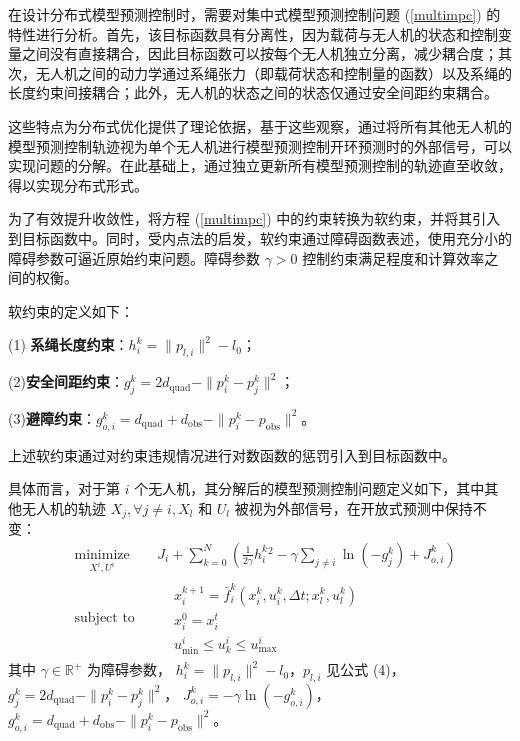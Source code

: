 \documentclass[lang=chs, degree=master, blindreview=false, winfonts=true]{yanputhesis}
\begin{document}
在设计分布式模型预测控制时，需要对集中式模型预测控制问题 (\ref{multimpc}) 的特性进行分析。首先，该目标函数具有分离性，因为载荷与无人机的状态和控制变量之间没有直接耦合，因此目标函数可以按每个无人机独立分离，减少耦合度；其次，无人机之间的动力学通过系绳张力（即载荷状态和控制量的函数）以及系绳的长度约束间接耦合；此外，无人机的状态之间的状态仅通过安全间距约束耦合。

这些特点为分布式优化提供了理论依据，基于这些观察，通过将所有其他无人机的模型预测控制轨迹视为单个无人机进行模型预测控制开环预测时的外部信号，可以实现问题的分解。在此基础上，通过独立更新所有模型预测控制的轨迹直至收敛，得以实现分布式形式。

为了有效提升收敛性，将方程 (\ref{multimpc}) 中的约束转换为软约束，并将其引入到目标函数中。同时，受内点法的启发，软约束通过障碍函数表述，使用充分小的障碍参数可逼近原始约束问题。障碍参数 $\gamma > 0$ 控制约束满足程度和计算效率之间的权衡。

软约束的定义如下：

    (1) \textbf{系绳长度约束}：$h_i^k = \|p_{l,i}\|^2 - l_0$；

    (2)\textbf{安全间距约束}：$g_j^k = 2d_{\text{quad}} - \|p_i^k - p_j^k\|^2$；

    (3)\textbf{避障约束}：$g_{o,i}^k = d_{\text{quad}} + d_{\text{obs}} - \|p_i^k - p_{\text{obs}}\|^2$。


上述软约束通过对约束违规情况进行对数函数的惩罚引入到目标函数中。

具体而言，对于第 $i$ 个无人机，其分解后的模型预测控制问题定义如下，其中其他无人机的轨迹 $X_j, \forall j \neq i, X_l$ 和 $U_l$ 被视为外部信号，在开放式预测中保持不变：
\begin{equation}
	\begin{aligned} 
	&\operatorname*{minimize}_{X^i,U^i}& & J_i + \sum_{k=0}^{N} \left( \frac{1}{2\gamma} h_i^k{}^2 - \gamma \sum_{j \neq i} \ln(-g_j^k) + J_{o,i}^k \right)\\
	&\text{subject to}& & \begin{aligned}
& x_i^{k+1} = \bar{f}_i^k(x_i^k, u_i^k, \Delta t; x_l^k, u_l^k) \\
& x_i^0 = x_i^t\\
& u^i_{\text{min}} \leq u^i_k \leq u^i_{\text{max}}		\end{aligned}	
\end{aligned}
\label{multiuav}
\end{equation}
其中
$\gamma \in \mathbb{R}^+$ 为障碍参数，
$h_i^k = \|p_{l,i}\|^2 - l_0$，$p_{l,i}$ 见公式 (4)，
$g_j^k = 2d_{\text{quad}} - \|p_i^k - p_j^k\|^2$，
$J_{o,i}^k = -\gamma \ln(-g_{o,i}^k)$，
$g_{o,i}^k = d_{\text{quad}} + d_{\text{obs}} - \|p_i^k - p_{\text{obs}}\|^2$。
\end{document}
